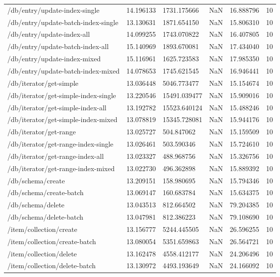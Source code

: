 \begin{tabularx}{\linewidth}{XXXXXX}
/db/entry/update-index-single & 14.196133 & 1731.175666 & NaN & 16.888796 & 10 \\
/db/entry/update-batch-index-single & 13.130631 & 1871.654150 & NaN & 15.806310 & 10 \\
/db/entry/update-index-all & 14.099255 & 1743.070822 & NaN & 16.407805 & 10 \\
/db/entry/update-batch-index-all & 15.140969 & 1893.670081 & NaN & 17.434040 & 10 \\
/db/entry/update-index-mixed & 15.116961 & 1625.723583 & NaN & 17.985350 & 10 \\
/db/entry/update-batch-index-mixed & 14.078653 & 1745.621545 & NaN & 16.946441 & 10 \\
/db/iterator/get-simple & 13.036448 & 5046.773477 & NaN & 15.154674 & 10 \\
/db/iterator/get-simple-index-single & 13.220546 & 15491.039477 & NaN & 15.909016 & 10 \\
/db/iterator/get-simple-index-all & 13.192782 & 15523.640124 & NaN & 15.488246 & 10 \\
/db/iterator/get-simple-index-mixed & 13.078819 & 15345.728081 & NaN & 15.944176 & 10 \\
/db/iterator/get-range & 13.025727 & 504.847062 & NaN & 15.159509 & 10 \\
/db/iterator/get-range-index-single & 13.026461 & 503.590346 & NaN & 15.724610 & 10 \\
/db/iterator/get-range-index-all & 13.023327 & 488.968756 & NaN & 15.326756 & 10 \\
/db/iterator/get-range-index-mixed & 13.022730 & 496.362898 & NaN & 15.889392 & 10 \\
/db/schema/create & 13.209151 & 158.980695 & NaN & 15.794346 & 10 \\
/db/schema/create-batch & 13.069147 & 160.683784 & NaN & 15.634375 & 10 \\
/db/schema/delete & 13.043513 & 812.664502 & NaN & 79.204385 & 10 \\
/db/schema/delete-batch & 13.047981 & 812.386223 & NaN & 79.108690 & 10 \\
/item/collection/create & 13.156777 & 5244.445505 & NaN & 26.596255 & 10 \\
/item/collection/create-batch & 13.080054 & 5351.659863 & NaN & 26.564721 & 10 \\
/item/collection/delete & 13.162478 & 4558.412177 & NaN & 24.206496 & 10 \\
/item/collection/delete-batch & 13.130972 & 4493.193649 & NaN & 24.166092 & 10 \\

\end{tabularx}
